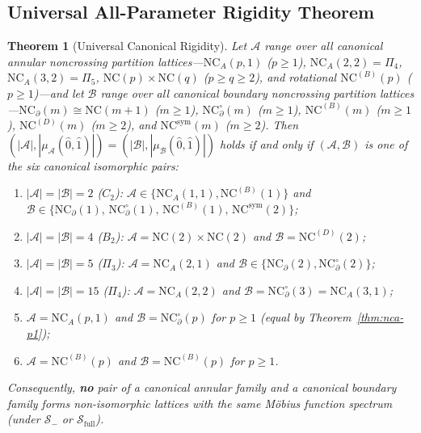 \documentclass[11pt]{article}
\newtheorem{theorem}{Theorem}[section]
\theoremstyle{definition}
\newcommand{\NC}{\mathrm{NC}}
\newcommand{\NCA}{\mathrm{NC}_A}
\newcommand{\NCB}{\mathrm{NC}^{(B)}}
\newcommand{\NCD}{\mathrm{NC}^{(D)}}
\newcommand{\NCsym}{\mathrm{NC}^{\mathrm{sym}}}
\begin{document}
\subsection{Universal All-Parameter Rigidity Theorem}

\begin{theorem}[Universal Canonical Rigidity]\label{thm:universal-rigidity}
Let $\mathcal{A}$ range over all canonical annular noncrossing partition lattices---$\NCA(p,1)$ ($p \ge 1$), $\NCA(2,2) = \Pi_4$, $\NCA(3,2) = \Pi_5$, $\NC(p)\times\NC(q)$ ($p \ge q \ge 2$), and rotational $\NCB(p)$ ($p \ge 1$)---and let $\mathcal{B}$ range over all canonical boundary noncrossing partition lattices---$\NC_\partial(m) \cong \NC(m+1)$ ($m \ge 1$), $\NC_\partial^\circ(m)$ ($m \ge 1$), $\NCB(m)$ ($m \ge 1$), $\NCD(m)$ ($m \ge 2$), and $\NCsym(m)$ ($m \ge 2$). Then $(|\mathcal{A}|, |\mu_{\mathcal{A}}(\hat{0},\hat{1})|) = (|\mathcal{B}|, |\mu_{\mathcal{B}}(\hat{0},\hat{1})|)$ holds if and only if $(\mathcal{A}, \mathcal{B})$ is one of the six canonical isomorphic pairs:
\begin{enumerate}
  \item $|\mathcal{A}| = |\mathcal{B}| = 2$ ($C_2$): $\mathcal{A} \in \{\NCA(1,1), \NCB(1)\}$ and $\mathcal{B} \in \{\NC_\partial(1),\allowbreak\, \NC_\partial^\circ(1),\allowbreak\, \NCB(1),\allowbreak\, \NCsym(2)\}$;
  \item $|\mathcal{A}| = |\mathcal{B}| = 4$ ($B_2$): $\mathcal{A} = \NC(2)\times\NC(2)$ and $\mathcal{B} = \NCD(2)$;
  \item $|\mathcal{A}| = |\mathcal{B}| = 5$ ($\Pi_3$): $\mathcal{A} = \NCA(2,1)$ and $\mathcal{B} \in \{\NC_\partial(2), \NC_\partial^\circ(2)\}$;
  \item $|\mathcal{A}| = |\mathcal{B}| = 15$ ($\Pi_4$): $\mathcal{A} = \NCA(2,2)$ and $\mathcal{B} = \NC_\partial^\circ(3) = \NCA(3,1)$;
  \item $\mathcal{A} = \NCA(p,1)$ and $\mathcal{B} = \NC_\partial^\circ(p)$ for $p \ge 1$ (equal by Theorem~\ref{thm:nca-p1});
  \item $\mathcal{A} = \NCB(p)$ and $\mathcal{B} = \NCB(p)$ for $p \ge 1$.
\end{enumerate}
Consequently, \textbf{no} pair of a canonical annular family and a canonical boundary family forms non-isomorphic lattices with the same M\"obius function spectrum (under $\mathcal{S}_-$ or $\mathcal{S}_{\mathrm{full}}$).
\end{theorem}
\end{document}

